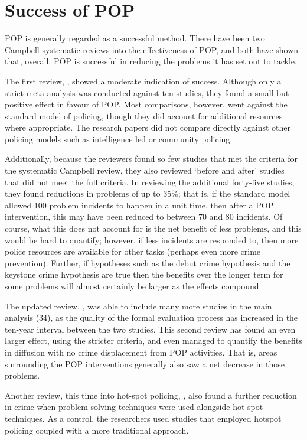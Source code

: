 \section{Success of POP} POP is generally regarded as a successful method. There have been two Campbell systematic reviews into the effectiveness of POP, and both have shown that, overall, POP is successful in reducing the problems it has set out to tackle. 

The first review, \parencite{popeffective}, showed a moderate indication of success. Although only a strict meta-analysis was conducted against ten studies, they found a small but positive effect in favour of POP. Most comparisons, however, went against the standard model of policing, though they did account for additional resources where appropriate. The research papers did not compare directly against other policing models such as intelligence led or community policing.

Additionally, because the reviewers found so few studies that met the criteria for the systematic Campbell review, they also reviewed ‘before and after’ studies that did not meet the full criteria. In reviewing the additional forty-five  studies, they found reductions in problems of up to 35\%; that is, if the standard model allowed 100 problem incidents to happen in a unit time, then after a POP intervention, this may have been reduced to between 70 and 80 incidents. Of course, what this does not account for is the net benefit of less problems, and this would be hard to quantify; however, if less incidents are responded to, then more police resources are available for other tasks (perhaps even more crime prevention). Further, if hypotheses such as the debut crime hypothesis and the keystone crime hypothesis  \parencite{farrell2015debuts} are true then the benefits over the longer term for some problems will almost certainly be larger as the effects compound. 

The updated review,  \parencite{hinkle2020problem}, was able to include many more studies in the main analysis (34), as the quality of the formal evaluation process has increased in the ten-year interval between the two studies. This second review has found an even larger effect, using the stricter criteria, and even managed to quantify the benefits in diffusion with no crime displacement from POP activities. That is, areas surrounding the POP interventions generally also saw a net decrease in those problems.

Another review, this time into hot-spot policing, \parencite{braga2014effects}, also found a further reduction in crime when problem solving techniques were used alongside hot-spot techniques. As a control, the researchers used studies that employed hotspot policing coupled with a more traditional approach.

